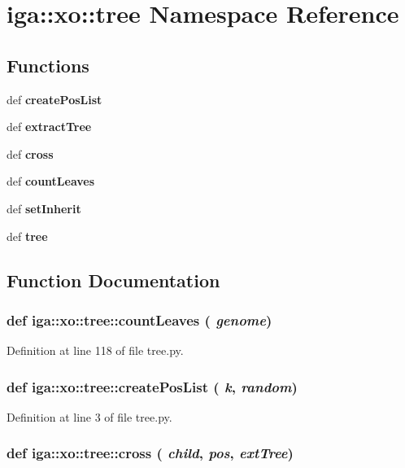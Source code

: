 \section{iga::xo::tree Namespace Reference}
\label{namespaceiga_1_1xo_1_1tree}


\subsection*{Functions}
\begin{CompactItemize}
\item 
def {\bf createPosList}
\item 
def {\bf extractTree}
\item 
def {\bf cross}
\item 
def {\bf countLeaves}
\item 
def {\bf setInherit}
\item 
def {\bf tree}
\end{CompactItemize}


\subsection{Function Documentation}
\subsubsection{\setlength{\rightskip}{0pt plus 5cm}def iga::xo::tree::countLeaves ( {\em genome})}\label{namespaceiga_1_1xo_1_1tree_bc28622107db3c8009bb720985c3d540}




Definition at line 118 of file tree.py.
\subsubsection{\setlength{\rightskip}{0pt plus 5cm}def iga::xo::tree::createPosList ( {\em k},  {\em random})}\label{namespaceiga_1_1xo_1_1tree_f43c5ce73e436bc3dcec83c205253fb2}




Definition at line 3 of file tree.py.
\subsubsection{\setlength{\rightskip}{0pt plus 5cm}def iga::xo::tree::cross ( {\em child},  {\em pos},  {\em extTree})}\label{namespaceiga_1_1xo_1_1tree_274876f5605823cdf26258cf02768f1e}




